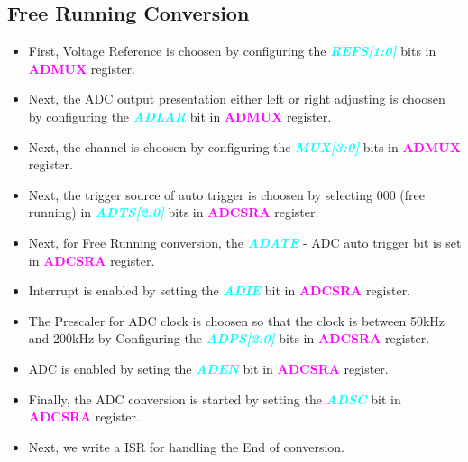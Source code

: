 \documentclass{article}
\newcommand{\bitFormat}[1]{\emph{\textbf{\textcolor{cyan}{#1}}}}
\newcommand{\regFormat}[1]{\textbf{\textcolor{magenta}{#1}}}
\begin{document}
\subsection{Free Running Conversion}
\begin{itemize}
    \item First, Voltage Reference is choosen by configuring the \bitFormat{REFS[1:0]} bits in \regFormat{ADMUX} register.
    \item Next, the ADC output presentation either left or right adjusting is choosen by configuring the \bitFormat{ADLAR} bit in \regFormat{ADMUX} register.
    \item Next, the channel is choosen by configuring the \bitFormat{MUX[3:0]} bits in \regFormat{ADMUX} register.
    \item Next, the trigger source of auto trigger is choosen by selecting 000 (free running) in \bitFormat{ADTS[2:0]} bits in \regFormat{ADCSRA} register.
    \item Next, for Free Running conversion, the \bitFormat{ADATE} - ADC auto trigger bit is set in \regFormat{ADCSRA} register.
    \item Interrupt is enabled by setting the \bitFormat{ADIE} bit in \regFormat{ADCSRA} register.
    \item The Prescaler for ADC clock is choosen so that the clock is  between 50kHz and 200kHz  by Configuring the \bitFormat{ADPS[2:0]} bits in \regFormat{ADCSRA} register.
    \item ADC is enabled by seting the \bitFormat{ADEN} bit in \regFormat{ADCSRA} register.
    \item Finally, the ADC conversion is started by setting the \bitFormat{ADSC} bit in  \regFormat{ADCSRA} register.
    \item Next, we write a ISR for handling the End of conversion.
\end{itemize}
\end{document}
